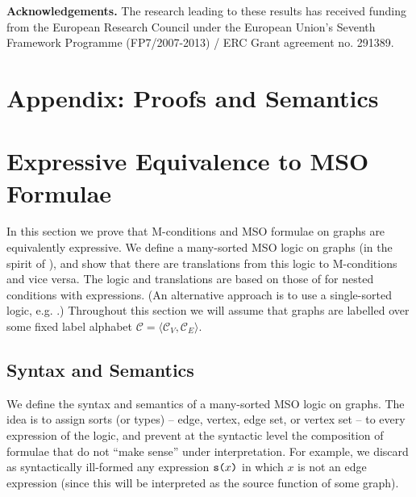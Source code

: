 \documentclass{llncs}
\newcommand{\mt}[1]{\text{\tt{#1}}}
\begin{document}
	\noindent \textbf{Acknowledgements.} The research leading to these results has received funding from the
	European Research Council under the European Union's Seventh Framework
	Programme (FP7/2007-2013) / ERC Grant agreement no. 291389.

	
	
	
	
	\newpage\appendix
	
	\section*{Appendix: Proofs and Semantics}
	
	\section{Expressive Equivalence to MSO Formulae}\label{app:proofs:expressiveness}
	
	In this section we prove that M-conditions and MSO formulae on graphs are equivalently expressive. We define a many-sorted MSO logic on graphs (in the spirit of \cite{Courcelle90a}), and show that there are translations from this logic to M-conditions and vice versa. The logic and translations are based on those of \cite{Poskitt13a} for nested conditions with expressions. (An alternative approach is to use a single-sorted logic, e.g. \cite{Habel-Radke10a}.) Throughout this section we will assume that graphs are labelled over some fixed label alphabet $\mathcal{C} = \langle \mathcal{C}_V,\mathcal{C}_E \rangle$.
	
	\subsection{Syntax and Semantics}
	
	We define the syntax and semantics of a many-sorted MSO logic on graphs. The idea is to assign sorts (or types) -- edge, vertex, edge set, or vertex set -- to every expression of the logic, and prevent at the syntactic level the composition of formulae that do not ``make sense'' under interpretation. For example, we discard as syntactically ill-formed any expression $\mathtt{s}\mt{(}x\mt{)}$ in which $x$ is not an edge expression (since this will be interpreted as the source function of some graph).
\end{document}
